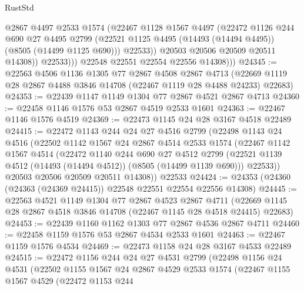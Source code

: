 \begin{lexlean}{RustStd}
\begin{coremodule}
                    @2867
                    @4497
                    @2533
                    @1574
                    (@22467
                      @1128
                      @1567
                      @4497
                      (@22472
                        @1126
                        @244
                        @690
                        @27
                        @4495
                        @2799
                        (@22521 @1125 @4495 (@14493 (@14494 @4495)) (@8505 (@14499 @1125 @690)))
                        @22533))
                    @20503
                    @20506
                    @20509
                    @20511
                    @14308))
                @22533)))
          @22548
          @22551
          @22554
          @22556
          @14308)))
@24345 := @22563
    @4506
    @1136
    @1305
    @77
    @2867
    @4508
    @2867
    @4713
    (@22669 @1119 @28 @2867 @4488 @3846 @14708 (@22467 @1119 @28 @4488 @24233) @22683)
@24353 := @22439 @1147 @1149 @1304 @77 @2867 @4521 @2867 @4713
@24360 := @22458 @1146 @1576 @53 @2867 @4519 @2533 @1601
@24363 := @22467 @1146 @1576 @4519
@24369 := @22473 @1145 @24 @28 @3167 @4518 @22489
@24415 := @22472
    @1143
    @244
    @24
    @27
    @4516
    @2799
    (@22498
      @1143
      @24
      @4516
      (@22502
        @1142
        @1567
        @24
        @2867
        @4514
        @2533
        @1574
        (@22467
          @1142
          @1567
          @4514
          (@22472
            @1140
            @244
            @690
            @27
            @4512
            @2799
            (@22521 @1139 @4512 (@14493 (@14494 @4512)) (@8505 (@14499 @1139 @690)))
            @22533))
        @20503
        @20506
        @20509
        @20511
        @14308))
    @22533
@24424 := @24353 (@24360 (@24363 (@24369 @24415)) @22548 @22551 @22554 @22556 @14308)
@24445 := @22563
    @4521
    @1149
    @1304
    @77
    @2867
    @4523
    @2867
    @4711
    (@22669 @1145 @28 @2867 @4518 @3846 @14708 (@22467 @1145 @28 @4518 @24415) @22683)
@24453 := @22439 @1160 @1162 @1303 @77 @2867 @4536 @2867 @4711
@24460 := @22458 @1159 @1576 @53 @2867 @4534 @2533 @1601
@24463 := @22467 @1159 @1576 @4534
@24469 := @22473 @1158 @24 @28 @3167 @4533 @22489
@24515 := @22472
    @1156
    @244
    @24
    @27
    @4531
    @2799
    (@22498
      @1156
      @24
      @4531
      (@22502
        @1155
        @1567
        @24
        @2867
        @4529
        @2533
        @1574
        (@22467
          @1155
          @1567
          @4529
          (@22472
            @1153
            @244

\end{coremodule}
\end{lexlean}
